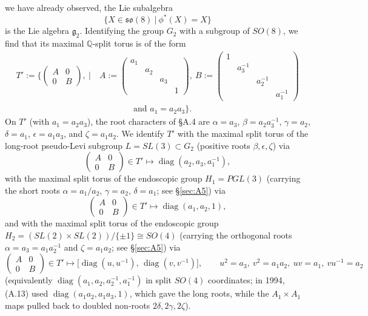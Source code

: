 \documentclass[12pt,letterpaper]{amsart}
\theoremstyle{plain}
\theoremstyle{definition}
\theoremstyle{remark}
\theoremstyle{definition}
\newcommand{\qqq}{\mathbb{Q}}
\DeclareMathOperator{\diag}{diag}
\begin{document}
we have already observed, the Lie subalgebra
\[
\{X \in \mathfrak{so}(8)\ |\ \phi^*(X) = X\}
\]
is the Lie algebra ${\mathfrak g}_2$. Identifying the group $G_2$
with a subgroup of $SO(8)$, we find that its maximal
$\qqq$-split torus is of the form
\[
\begin{split}
T':= \Big\{\begin{pmatrix} A&0\\0&B \end{pmatrix},\ |\
&A:={\left(\begin{smallmatrix} a_1&&&\\
&a_2&&\\
&&a_3&\\
&&&1 \end{smallmatrix}\right)},\
B:= {\left(\begin{smallmatrix} 1&&&\\
&a_3^{-1}&&\\
&&a_2^{-1}&\\
&&&a_1^{-1} \end{smallmatrix}\right)}\\
&\quad\quad\quad\quad\text{and } a_1 = a_2a_3\Big\}.
\end{split}\tag{A.12}
\]
On $T'$ (with $a_1=a_2a_3$), the root characters of \S A.4 are
$\alpha=a_3$, $\beta=a_2a_3^{-1}$, $\gamma=a_2$, $\delta=a_1$,
$\epsilon=a_1a_3$, and $\zeta=a_1a_2$.
We identify $T'$ with the maximal split torus of the long-root pseudo-Levi
subgroup $L=SL(3)\subset G_2$ (positive roots $\beta,\epsilon,\zeta$) via
\[
\begin{pmatrix} A&0\\0&B \end{pmatrix} \in T' \longmapsto
\diag(a_2,a_3,a_1^{-1}),
\]
with the maximal split torus of the endoscopic group $H_1=PGL(3)$ (carrying the
short roots $\alpha=a_1/a_2$, $\gamma=a_2$, $\delta=a_1$; see \S\ref{sec:A5}) via
\[
\begin{pmatrix} A&0\\0&B \end{pmatrix} \in T' \longmapsto
\diag(a_1,a_2,1),\tag{A.13}
\]
and with the maximal split torus of the endoscopic group
$H_2=(SL(2)\times SL(2))/\{\pm 1\}\cong SO(4)$ (carrying the orthogonal roots
$\alpha=a_3=a_1a_2^{-1}$ and $\zeta=a_1a_2$; see \S\ref{sec:A5}) via
\[
\begin{pmatrix} A&0\\0&B \end{pmatrix} \in T' \longmapsto
\bigl[\diag(u,u^{-1}),\,\diag(v,v^{-1})\bigr],\qquad
u^2=a_3,\ v^2=a_1a_2,\ uv=a_1,\ vu^{-1}=a_2
\tag{A.13$'$}
\]
(equivalently $\diag(a_1,a_2,a_2^{-1},a_1^{-1})$ in split $SO(4)$ coordinates;
in 1994, (A.13) used $\diag(a_1a_2,a_1a_3,1)$, which gave the long roots, while
the $A_1\times A_1$ maps pulled back to doubled non-roots $2\delta,2\gamma,2\zeta$).
\end{document}
